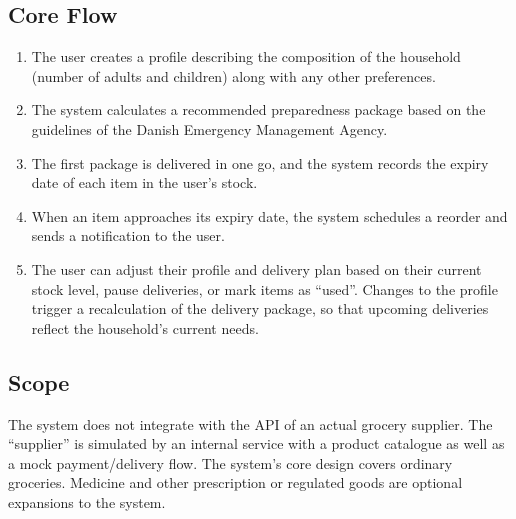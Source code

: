 \documentclass[11pt,a4paper]{article}
\begin{document}
\subsection*{Core Flow}
\begin{enumerate}[nosep]
  \item The user creates a profile describing the composition of the household (number of adults and children) along with any other preferences.
  \item The system calculates a recommended preparedness package based on the guidelines of the Danish Emergency Management Agency.
  \item The first package is delivered in one go, and the system records the expiry date of each item in the user's stock.
  \item When an item approaches its expiry date, the system schedules a reorder and sends a notification to the user.
  \item The user can adjust their profile and delivery plan based on their current stock level, pause deliveries, or mark items as ``used''.  Changes to the profile trigger a recalculation of the delivery package, so that upcoming deliveries reflect the household's current needs.
\end{enumerate}
\subsection*{Scope}
The system does not integrate with the API of an actual grocery supplier. The
``supplier'' is simulated by an internal service with a product catalogue as well as a mock
payment/delivery flow.
The system's core design covers ordinary groceries. Medicine and other prescription or regulated goods are optional expansions to the system.
\end{document}

